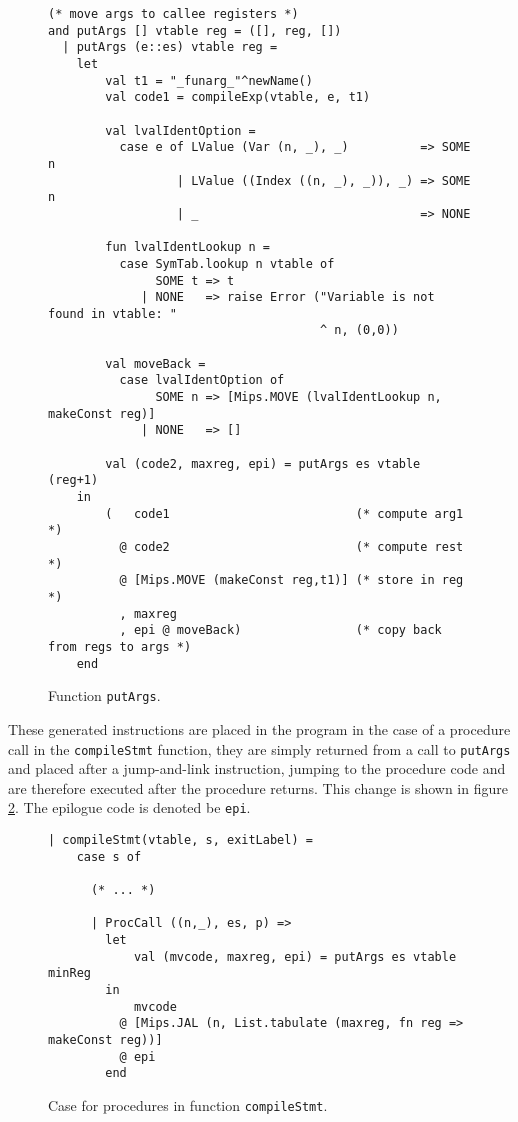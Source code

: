 \begin{figure}[H]
  \begin{lstlisting}[style=MLStyle]
(* move args to callee registers *)
and putArgs [] vtable reg = ([], reg, [])
  | putArgs (e::es) vtable reg =
    let
        val t1 = "_funarg_"^newName()
        val code1 = compileExp(vtable, e, t1)

        val lvalIdentOption =
          case e of LValue (Var (n, _), _)          => SOME n
                  | LValue ((Index ((n, _), _)), _) => SOME n
                  | _                               => NONE

        fun lvalIdentLookup n =
          case SymTab.lookup n vtable of
               SOME t => t
             | NONE   => raise Error ("Variable is not found in vtable: "
                                      ^ n, (0,0))

        val moveBack =
          case lvalIdentOption of
               SOME n => [Mips.MOVE (lvalIdentLookup n, makeConst reg)]
             | NONE   => []

        val (code2, maxreg, epi) = putArgs es vtable (reg+1)
    in
        (   code1                          (* compute arg1 *)
          @ code2                          (* compute rest *)
          @ [Mips.MOVE (makeConst reg,t1)] (* store in reg *)
          , maxreg
          , epi @ moveBack)                (* copy back from regs to args *)
    end
  \end{lstlisting}
  \caption{Function \texttt{putArgs}.}
  \label{fig_putArgs}
\end{figure}

\noindent
These generated instructions are placed in the program in the case of a
procedure call in the \verb|compileStmt| function, they are simply returned from
a call to \verb|putArgs| and placed after a jump-and-link instruction, jumping
to the procedure code and are therefore executed after the procedure returns.
This change is shown in figure \ref{fig_compileStmt}. The epilogue code is
denoted be \verb|epi|.

\begin{figure}[H]
  \begin{lstlisting}[style=MLStyle]
| compileStmt(vtable, s, exitLabel) =
    case s of 

      (* ... *)

      | ProcCall ((n,_), es, p) => 
        let
            val (mvcode, maxreg, epi) = putArgs es vtable minReg
        in
            mvcode
          @ [Mips.JAL (n, List.tabulate (maxreg, fn reg => makeConst reg))]
          @ epi
        end
  \end{lstlisting}
  \caption{Case for procedures in function \texttt{compileStmt}.}
  \label{fig_compileStmt}
\end{figure}

